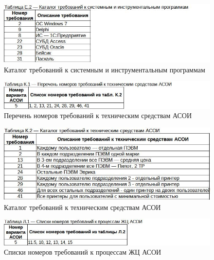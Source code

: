 \documentclass[12pt, a4paper, simple]{eskdtext}
\begin{document}
    \begin{figure}[ph!]
        \centering
        \includegraphics[]
            {_docs/ТаблицаЕ2КаталогТребованийКСистемнымИИнструментальнымПрограммам.jpg}
        \caption{Каталог требований к системным и инструментальным программам}
    \end{figure}

    \begin{figure}[ph!]
        \centering
        \includegraphics[]
            {_docs/ТаблицаК1ПереченьНомеровТребованийКТехническимСредствамАСОИ.jpg}
        \caption{Перечень номеров требований к техническим средствам АСОИ}
    \end{figure}

    \begin{figure}[ph!]
        \centering
        \includegraphics[]
            {_docs/ТаблицаК2КаталогТребованийКТехническимСредствамАСОИ.jpg}
        \caption{Каталог требований к техническим средствам АСОИ}
    \end{figure}

    \begin{figure}[ph!]
        \centering
        \includegraphics[]
            {_docs/ТаблицаЛ1СпискиНомеровТребованийКПроцессамЖЦАСОИ.jpg}
        \caption{Списки номеров требований к процессам ЖЦ АСОИ}
    \end{figure}
\end{document}

